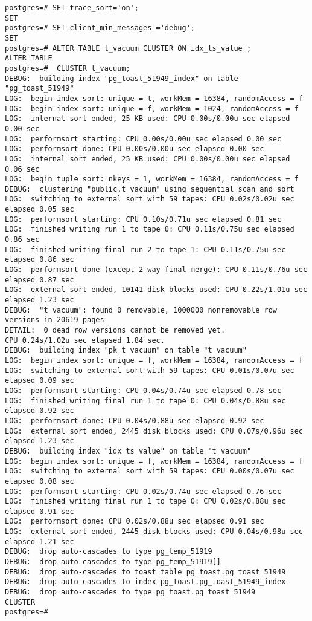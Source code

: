 \begin{lstlisting}[style=pgsql]
postgres=# SET trace_sort='on';
SET
postgres=# SET client_min_messages ='debug';
SET
postgres=# ALTER TABLE t_vacuum CLUSTER ON idx_ts_value ;
ALTER TABLE
postgres=#  CLUSTER t_vacuum;
DEBUG:  building index "pg_toast_51949_index" on table "pg_toast_51949"
LOG:  begin index sort: unique = t, workMem = 16384, randomAccess = f
LOG:  begin index sort: unique = f, workMem = 1024, randomAccess = f
LOG:  internal sort ended, 25 KB used: CPU 0.00s/0.00u sec elapsed 0.00 sec
LOG:  performsort starting: CPU 0.00s/0.00u sec elapsed 0.00 sec
LOG:  performsort done: CPU 0.00s/0.00u sec elapsed 0.00 sec
LOG:  internal sort ended, 25 KB used: CPU 0.00s/0.00u sec elapsed 0.06 sec
LOG:  begin tuple sort: nkeys = 1, workMem = 16384, randomAccess = f
DEBUG:  clustering "public.t_vacuum" using sequential scan and sort
LOG:  switching to external sort with 59 tapes: CPU 0.02s/0.02u sec elapsed 0.05 sec
LOG:  performsort starting: CPU 0.10s/0.71u sec elapsed 0.81 sec
LOG:  finished writing run 1 to tape 0: CPU 0.11s/0.75u sec elapsed 0.86 sec
LOG:  finished writing final run 2 to tape 1: CPU 0.11s/0.75u sec elapsed 0.86 sec
LOG:  performsort done (except 2-way final merge): CPU 0.11s/0.76u sec elapsed 0.87 sec
LOG:  external sort ended, 10141 disk blocks used: CPU 0.22s/1.01u sec elapsed 1.23 sec
DEBUG:  "t_vacuum": found 0 removable, 1000000 nonremovable row versions in 20619 pages
DETAIL:  0 dead row versions cannot be removed yet.
CPU 0.24s/1.02u sec elapsed 1.84 sec.
DEBUG:  building index "pk_t_vacuum" on table "t_vacuum"
LOG:  begin index sort: unique = f, workMem = 16384, randomAccess = f
LOG:  switching to external sort with 59 tapes: CPU 0.01s/0.07u sec elapsed 0.09 sec
LOG:  performsort starting: CPU 0.04s/0.74u sec elapsed 0.78 sec
LOG:  finished writing final run 1 to tape 0: CPU 0.04s/0.88u sec elapsed 0.92 sec
LOG:  performsort done: CPU 0.04s/0.88u sec elapsed 0.92 sec
LOG:  external sort ended, 2445 disk blocks used: CPU 0.07s/0.96u sec elapsed 1.23 sec
DEBUG:  building index "idx_ts_value" on table "t_vacuum"
LOG:  begin index sort: unique = f, workMem = 16384, randomAccess = f
LOG:  switching to external sort with 59 tapes: CPU 0.00s/0.07u sec elapsed 0.08 sec
LOG:  performsort starting: CPU 0.02s/0.74u sec elapsed 0.76 sec
LOG:  finished writing final run 1 to tape 0: CPU 0.02s/0.88u sec elapsed 0.91 sec
LOG:  performsort done: CPU 0.02s/0.88u sec elapsed 0.91 sec
LOG:  external sort ended, 2445 disk blocks used: CPU 0.04s/0.98u sec elapsed 1.21 sec
DEBUG:  drop auto-cascades to type pg_temp_51919
DEBUG:  drop auto-cascades to type pg_temp_51919[]
DEBUG:  drop auto-cascades to toast table pg_toast.pg_toast_51949
DEBUG:  drop auto-cascades to index pg_toast.pg_toast_51949_index
DEBUG:  drop auto-cascades to type pg_toast.pg_toast_51949
CLUSTER
postgres=#

\end{lstlisting}

